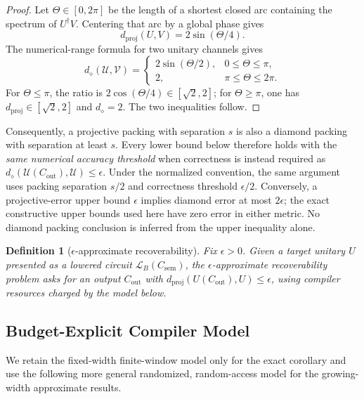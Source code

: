 \documentclass[a4paper,twocolumn,10pt,unpublished]{quantumarticle}
\newtheorem{definition}{Definition}
\begin{document}
\begin{proof}
Let $\Theta\in[0,2\pi]$ be the length of a shortest closed arc containing
the spectrum of $U^\dagger V$.  Centering that arc by a global phase gives
\begin{equation*}
 d_{\mathrm{proj}}(U,V)=2\sin(\Theta/4).
\end{equation*}
The numerical-range formula for two unitary channels gives
\begin{equation*}
 d_\diamond(\mathcal U,\mathcal V)=
 \begin{cases}
  2\sin(\Theta/2),&0\leq\Theta\leq\pi,\\
  2,&\pi\leq\Theta\leq2\pi.
 \end{cases}
\end{equation*}
For $\Theta\leq\pi$, the ratio is $2\cos(\Theta/4)\in[\sqrt2,2]$;
for $\Theta\geq\pi$, one has
$d_{\mathrm{proj}}\in[\sqrt2,2]$ and $d_\diamond=2$.  The two inequalities
follow.
\end{proof}

Consequently, a projective packing with separation $s$ is also a diamond
packing with separation at least $s$.  Every lower bound below therefore
holds with the \emph{same numerical accuracy threshold} when correctness is
instead required as
$d_\diamond(\mathcal U(C_{\mathrm{out}}),\mathcal U)\leq\epsilon$.
Under the normalized convention, the same argument uses packing separation
$s/2$ and correctness threshold $\epsilon/2$.
Conversely, a projective-error upper bound $\epsilon$ implies diamond error
at most $2\epsilon$; the exact constructive upper bounds used here have zero
error in either metric.  No diamond packing conclusion is inferred from the
upper inequality alone.

\begin{definition}[$\epsilon$-approximate recoverability]
\label{def:approx-recoverability}
Fix $\epsilon > 0$. Given a target unitary $U$ presented as a lowered
circuit $\mathcal{L}_B(C_{\mathrm{sem}})$, the $\epsilon$-approximate
recoverability problem asks for an output $C_{\mathrm{out}}$ with
$d_{\mathrm{proj}}(U(C_{\mathrm{out}}), U) \leq \epsilon$, using compiler
resources charged by the model below.
\end{definition}

\subsection{Budget-Explicit Compiler Model}

We retain the fixed-width finite-window model only for the exact corollary
and use the following more general randomized, random-access model for the
growing-width approximate results.
\end{document}
